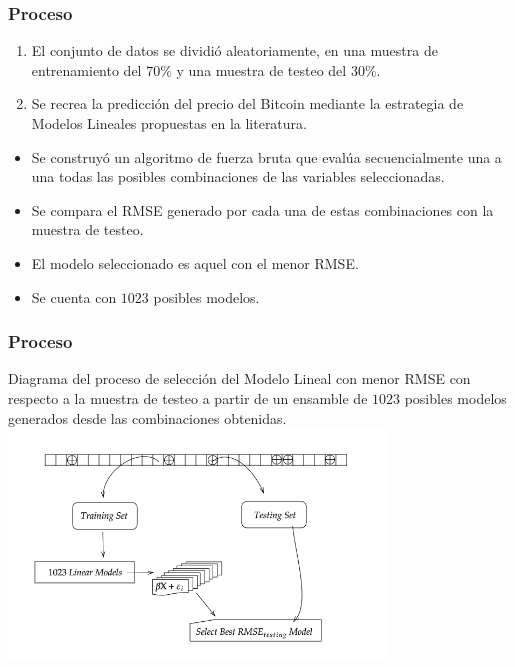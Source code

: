 \documentclass{beamer}
\begin{document}
\begin{frame}[t]
\frametitle{Proceso}

\vfill
\begin{enumerate}
\item 
El conjunto de datos se dividió aleatoriamente, en una muestra de entrenamiento del $70\%$ y una muestra de testeo del $30\%$.
\item 
Se recrea la predicción del precio del Bitcoin mediante la estrategia de Modelos Lineales propuestas en la literatura. 
\end{enumerate}
\begin{itemize}
\item
Se construyó un algoritmo de fuerza bruta que evalúa secuencialmente una a una todas las posibles combinaciones de las variables seleccionadas.
\item
Se compara el RMSE generado por cada una de estas combinaciones con la muestra de testeo. 
\item 
El modelo seleccionado es aquel con el menor RMSE. 

\item Se cuenta con $1023$ posibles modelos.
\end{itemize}



\vfill
\end{frame}
\begin{frame}[t]
\frametitle{Proceso}
\vfill
Diagrama del proceso de selección del Modelo Lineal con menor RMSE con respecto a la muestra de testeo a partir de un ensamble de $1023$ posibles modelos generados desde las combinaciones obtenidas.
\vfill
\centering
\includegraphics[width=0.75\textwidth]{diagramLinearRegression}
\end{frame}
\end{document}
